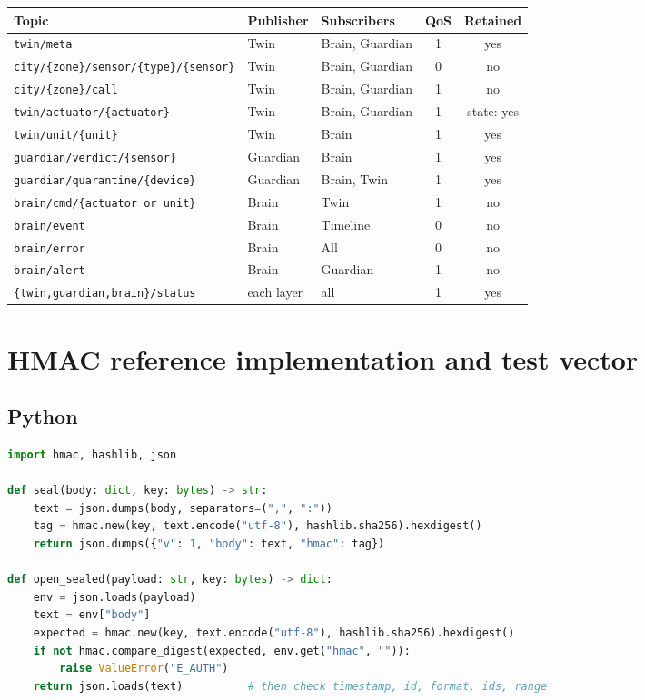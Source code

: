 \documentclass[11pt,a4paper]{article}
\newcommand{\code}[1]{\texttt{#1}}
\begin{document}
{\small\begin{longtable}{@{}p{6.3cm} l p{2.6cm} c c@{}}
\toprule
\textbf{Topic} & \textbf{Publisher} & \textbf{Subscribers} & \textbf{QoS} & \textbf{Retained} \\
\midrule
\endhead
\code{twin/meta} & Twin & Brain, Guardian & 1 & yes \\
\code{city/\allowbreak \{zone\}/\allowbreak sensor/\allowbreak \{type\}/\allowbreak \{sensor\}} & Twin & Brain, Guardian & 0 & no \\
\code{city/\{zone\}/call} & Twin & Brain, Guardian & 1 & no \\
\code{twin/\allowbreak actuator/\allowbreak \{actuator\}} & Twin & Brain, Guardian & 1 & state: yes \\
\code{twin/unit/\{unit\}} & Twin & Brain & 1 & yes \\
\code{guardian/\allowbreak verdict/\allowbreak \{sensor\}} & Guardian & Brain & 1 & yes \\
\code{guardian/\allowbreak quarantine/\allowbreak \{device\}} & Guardian & Brain, Twin & 1 & yes \\
\code{brain/\allowbreak cmd/\allowbreak \{actuator or unit\}} & Brain & Twin & 1 & no \\
\code{brain/event} & Brain & Timeline & 0 & no \\
\code{brain/error} & Brain & All & 0 & no \\
\code{brain/alert} & Brain & Guardian & 1 & no \\
\code{\{twin,guardian,brain\}/\allowbreak status} & each layer & all & 1 & yes \\
\bottomrule
\end{longtable}}

\section{HMAC reference implementation and test vector}
\label{annex:hmac}

\subsection{Python}
\begin{lstlisting}[language=Python]
import hmac, hashlib, json

def seal(body: dict, key: bytes) -> str:
    text = json.dumps(body, separators=(",", ":"))
    tag = hmac.new(key, text.encode("utf-8"), hashlib.sha256).hexdigest()
    return json.dumps({"v": 1, "body": text, "hmac": tag})

def open_sealed(payload: str, key: bytes) -> dict:
    env = json.loads(payload)
    text = env["body"]
    expected = hmac.new(key, text.encode("utf-8"), hashlib.sha256).hexdigest()
    if not hmac.compare_digest(expected, env.get("hmac", "")):
        raise ValueError("E_AUTH")
    return json.loads(text)          # then check timestamp, id, format, ids, range
\end{lstlisting}
\end{document}
